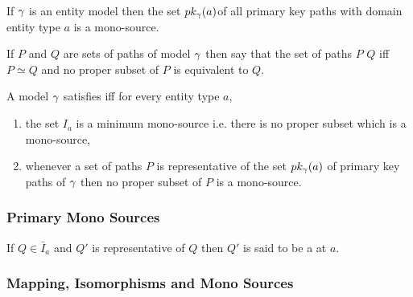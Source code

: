 \begin{corollary}
\label{primarykeycorallary}
If $\gamma$ is an entity model then the set $pk_{\gamma}(a)$of all primary key paths 
with domain entity type $a$ is a mono-source.
\end{corollary}


\begin{definition}
If $P$ and $Q$ are sets of paths of model $\gamma$ then say that the set of paths $P$ 
 $Q$ 
iff $P \simeq Q$ and no proper subset of $P$ is equivalent to $Q$.
\end{definition}


\begin{definition}
A model $\gamma$ satisfies  iff for every entity type $a$,
\begin{enumerate}
\item the set $I_a$ is a minimum mono-source i.e. there is no proper subset which is a mono-source,
\item whenever a set of paths $P$ is representative of the set $pk_{\gamma}(a)$  of primary key paths of $\gamma$ then no proper subset of $P$ is a mono-source.
\end{enumerate}
\end{definition}


\subsubsection{Primary Mono Sources}
\begin{definition}
If $Q \in \bar{I}_a$ and $Q'$ is representative of $Q$ then $Q'$ is said to be
a  at $a$. 
\end{definition}

\subsubsection{Mapping, Isomorphisms and Mono Sources}

